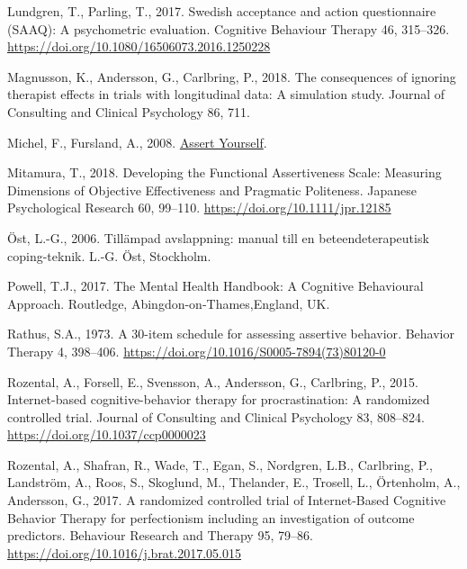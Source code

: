 \documentclass[3p]{elsarticle} %
\newlength{\cslhangindent}
\newlength{\cslentryspacingunit} %
\newenvironment{CSLReferences}[2] %
 {%
  \setlength{\parindent}{0pt}
  \ifodd #1
  \let\oldpar\par
  \def\par{\hangindent=\cslhangindent\oldpar}
  \fi
  \setlength{\parskip}{#2\cslentryspacingunit}
 }%
 {}
\begin{document}
\begin{CSLReferences}{1}{0}
\leavevmode{}%
Lundgren, T., Parling, T., 2017. Swedish acceptance and action
questionnaire (SAAQ): A psychometric evaluation. Cognitive Behaviour
Therapy 46, 315--326.
\url{https://doi.org/10.1080/16506073.2016.1250228}

\leavevmode{}%
Magnusson, K., Andersson, G., Carlbring, P., 2018. The consequences of
ignoring therapist effects in trials with longitudinal data: A
simulation study. Journal of Consulting and Clinical Psychology 86, 711.

\leavevmode{}%
Michel, F., Fursland, A., 2008.
\href{https://www.cci.health.wa.gov.au/Resources/Looking-After-Yourself/Assertiveness}{{Assert
Yourself}}.

\leavevmode{}%
Mitamura, T., 2018. {Developing the Functional Assertiveness Scale:
Measuring Dimensions of Objective Effectiveness and Pragmatic
Politeness}. Japanese Psychological Research 60, 99--110.
\url{https://doi.org/10.1111/jpr.12185}

\leavevmode{}%
Öst, L.-G., 2006. {Till{ä}mpad avslappning: manual till en
beteendeterapeutisk coping-teknik}. L.-G. {Ö}st, Stockholm.

\leavevmode{}%
Powell, T.J., 2017. {The Mental Health Handbook: A Cognitive Behavioural
Approach}. Routledge, Abingdon-on-Thames,England, UK.

\leavevmode{}%
Rathus, S.A., 1973. {A 30-item schedule for assessing assertive
behavior}. Behavior Therapy 4, 398--406.
\url{https://doi.org/10.1016/S0005-7894(73)80120-0}

\leavevmode{}%
Rozental, A., Forsell, E., Svensson, A., Andersson, G., Carlbring, P.,
2015. {Internet-based cognitive-behavior therapy for procrastination: A
randomized controlled trial}. Journal of Consulting and Clinical
Psychology 83, 808--824. \url{https://doi.org/10.1037/ccp0000023}

\leavevmode{}%
Rozental, A., Shafran, R., Wade, T., Egan, S., Nordgren, L.B.,
Carlbring, P., Landström, A., Roos, S., Skoglund, M., Thelander, E.,
Trosell, L., Örtenholm, A., Andersson, G., 2017. {A randomized
controlled trial of Internet-Based Cognitive Behavior Therapy for
perfectionism including an investigation of outcome predictors}.
Behaviour Research and Therapy 95, 79--86.
\url{https://doi.org/10.1016/j.brat.2017.05.015}


\end{CSLReferences}
\end{document}
